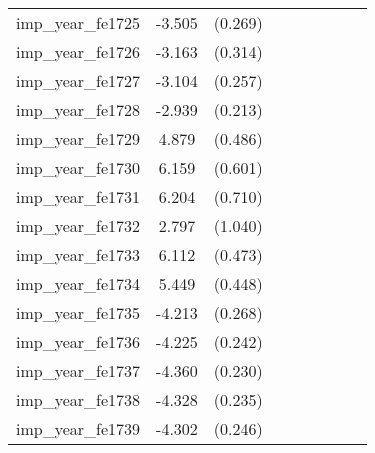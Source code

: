 {\begin{tabular}{l*{4}{cc}}
imp\_year\_fe1725&   -3.505\sym{***}&  (0.269)&                  &         &                  &         &                  &         \\
imp\_year\_fe1726&   -3.163\sym{***}&  (0.314)&                  &         &                  &         &                  &         \\
imp\_year\_fe1727&   -3.104\sym{***}&  (0.257)&                  &         &                  &         &                  &         \\
imp\_year\_fe1728&   -2.939\sym{***}&  (0.213)&                  &         &                  &         &                  &         \\
imp\_year\_fe1729&    4.879\sym{***}&  (0.486)&                  &         &                  &         &                  &         \\
imp\_year\_fe1730&    6.159\sym{***}&  (0.601)&                  &         &                  &         &                  &         \\
imp\_year\_fe1731&    6.204\sym{***}&  (0.710)&                  &         &                  &         &                  &         \\
imp\_year\_fe1732&    2.797\sym{**} &  (1.040)&                  &         &                  &         &                  &         \\
imp\_year\_fe1733&    6.112\sym{***}&  (0.473)&                  &         &                  &         &                  &         \\
imp\_year\_fe1734&    5.449\sym{***}&  (0.448)&                  &         &                  &         &                  &         \\
imp\_year\_fe1735&   -4.213\sym{***}&  (0.268)&                  &         &                  &         &                  &         \\
imp\_year\_fe1736&   -4.225\sym{***}&  (0.242)&                  &         &                  &         &                  &         \\
imp\_year\_fe1737&   -4.360\sym{***}&  (0.230)&                  &         &                  &         &                  &         \\
imp\_year\_fe1738&   -4.328\sym{***}&  (0.235)&                  &         &                  &         &                  &         \\
imp\_year\_fe1739&   -4.302\sym{***}&  (0.246)&                  &         &                  &         &                  &         \\

\end{tabular}}
